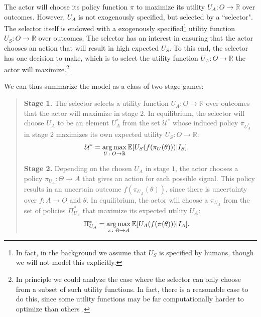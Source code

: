 The actor will choose its policy function $\pi$ to maximize its utility $U_A\colon O\to \mathbb R$ over outcomes. However, $U_A$ is not exogenously specified, but selected by a ``selector". The selector itself is endowed with a exogenously specified\footnote{In fact, in the background we assume that $U_S$ is specified by humans, though we will not model this explicitly.} utility function $U_S\colon O\to \mathbb R$ over outcomes. The selector has an interest in ensuring that the actor chooses an action that will result in high expected $U_S$. To this end, the selector has one decision to make, which is to select the utility function $U_A\colon O\to \mathbb R$ the actor will maximize.\footnote{In principle we could analyze the case where the selector can only choose from a subset of such utility functions. In fact, there is a reasonable case to do this, since some utility functions may be far computationally harder to optimize than others \cite{Hubinger2019}. }

\medskip\noindent We can thus summarize the model as a class of two stage games:

\begin{quote}
	\textbf{Stage 1.} The selector selects a utility function $U_A\colon O\to \mathbb R$ over outcomes that the actor will maximize in stage $2$. In equilibrium, the selector will choose $U_A$ to be an element $U_A^*$ from the set $\mathcal U^*$ whose induced policy $\pi_{U^*_A}$ in stage $2$ maximizes its own expected utility $U_S\colon O\to \mathbb R$:
	\begin{align*}
	\mathcal U^* &= \operatorname*{arg\,max}_{U\colon O\to \mathbb R} \mathbb E [U_S(f(\pi_U(\theta)))|I_S].
	\end{align*}
	
	\textbf{Stage 2.} Depending on the chosen $U_A$ in stage $1$, the actor chooses a policy $\pi_{U_A}\colon \Theta\to A$ that gives an action for each possible signal. This policy results in an uncertain outcome $f(\pi_{U_A}(\theta))$, since there is uncertainty over $f\colon A\to O$ and $\theta$. In equilibrium, the actor will choose a $\pi_{U_A}$ from the set of policies $\Pi^*_{U_A}$ that maximize its expected utility $U_A$:
	\begin{align*}
	\Pi^*_{U_A} &= \operatorname*{arg\,max}_{\pi\colon \Theta\to A} \mathbb E [U_A(f(\pi(\theta)))|I_A].
	\end{align*}
\end{quote}

